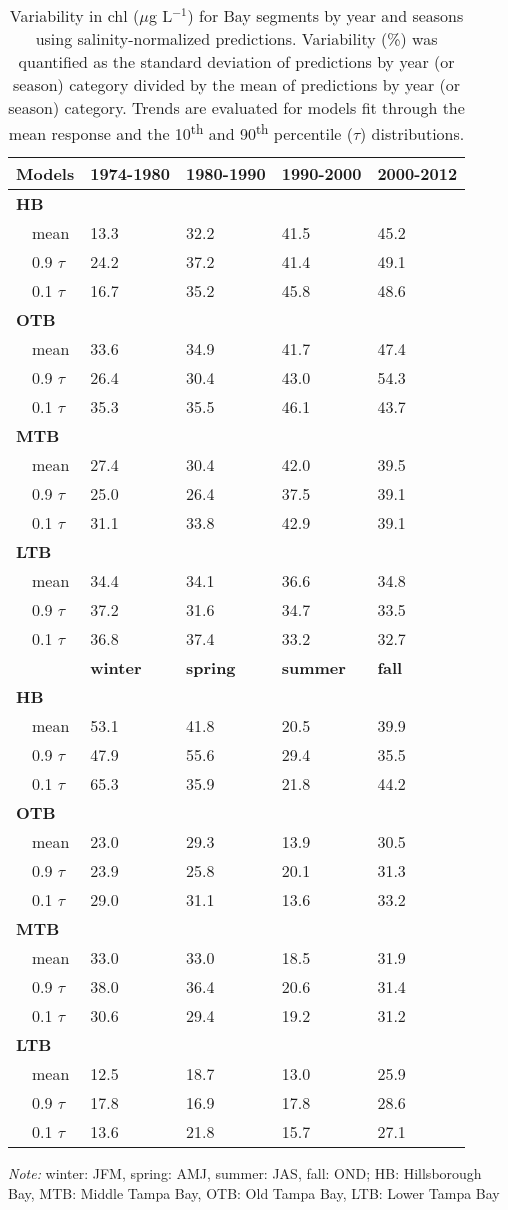 \documentclass{svjour3}\usepackage[]{graphicx}\usepackage[]{color}
\newcommand{\mugl}{$\mu$g L$^{-1}$}
\begin{document}
%
\begin{table}[!tbp]
\caption{Variability in \ac{chl} (\mugl) for Bay segments by year and seasons using salinity-normalized predictions.  Variability (\%) was quantified as the standard deviation of predictions by year (or season) category divided by the mean of predictions by year (or season) category.  Trends are evaluated for models fit through the mean response and the 10\textsuperscript{th} and 90\textsuperscript{th} percentile ($\tau$) distributions.\label{tab:nrmcv}} 
\begin{center}
\begin{tabular}{lllll}
\hline\hline
\multicolumn{1}{l}{{\bf Models}}&\multicolumn{1}{c}{{\bf 1974-1980}}&\multicolumn{1}{c}{{\bf 1980-1990}}&\multicolumn{1}{c}{{\bf 1990-2000}}&\multicolumn{1}{c}{{\bf 2000-2012}}\tabularnewline
\hline
{\bfseries HB}&&&&\tabularnewline
~~mean&13.3&32.2&41.5&45.2\tabularnewline
~~0.9 $\tau$&24.2&37.2&41.4&49.1\tabularnewline
~~0.1 $\tau$&16.7&35.2&45.8&48.6\tabularnewline
\hline
{\bfseries OTB}&&&&\tabularnewline
~~mean&33.6&34.9&41.7&47.4\tabularnewline
~~0.9 $\tau$&26.4&30.4&43.0&54.3\tabularnewline
~~0.1 $\tau$&35.3&35.5&46.1&43.7\tabularnewline
\hline
{\bfseries MTB}&&&&\tabularnewline
~~mean&27.4&30.4&42.0&39.5\tabularnewline
~~0.9 $\tau$&25.0&26.4&37.5&39.1\tabularnewline
~~0.1 $\tau$&31.1&33.8&42.9&39.1\tabularnewline
\hline
{\bfseries LTB}&&&&\tabularnewline
~~mean&34.4&34.1&36.6&34.8\tabularnewline
~~0.9 $\tau$&37.2&31.6&34.7&33.5\tabularnewline
~~0.1 $\tau$&36.8&37.4&33.2&32.7\tabularnewline
\hline
~~&{\bf winter}&{\bf spring}&{\bf summer}&{\bf fall}\tabularnewline
\hline
{\bfseries HB}&&&&\tabularnewline
~~mean&53.1&41.8&20.5&39.9\tabularnewline
~~0.9 $\tau$&47.9&55.6&29.4&35.5\tabularnewline
~~0.1 $\tau$&65.3&35.9&21.8&44.2\tabularnewline
\hline
{\bfseries OTB}&&&&\tabularnewline
~~mean&23.0&29.3&13.9&30.5\tabularnewline
~~0.9 $\tau$&23.9&25.8&20.1&31.3\tabularnewline
~~0.1 $\tau$&29.0&31.1&13.6&33.2\tabularnewline
\hline
{\bfseries MTB}&&&&\tabularnewline
~~mean&33.0&33.0&18.5&31.9\tabularnewline
~~0.9 $\tau$&38.0&36.4&20.6&31.4\tabularnewline
~~0.1 $\tau$&30.6&29.4&19.2&31.2\tabularnewline
\hline
{\bfseries LTB}&&&&\tabularnewline
~~mean&12.5&18.7&13.0&25.9\tabularnewline
~~0.9 $\tau$&17.8&16.9&17.8&28.6\tabularnewline
~~0.1 $\tau$&13.6&21.8&15.7&27.1\tabularnewline
\hline
\end{tabular}
\end{center}
\footnotesize \textit{Note:} winter: JFM, spring: AMJ, summer: JAS, fall: OND; HB: Hillsborough Bay, MTB: Middle Tampa Bay, OTB: Old Tampa Bay, LTB: Lower Tampa Bay\end{table}
\end{document}
